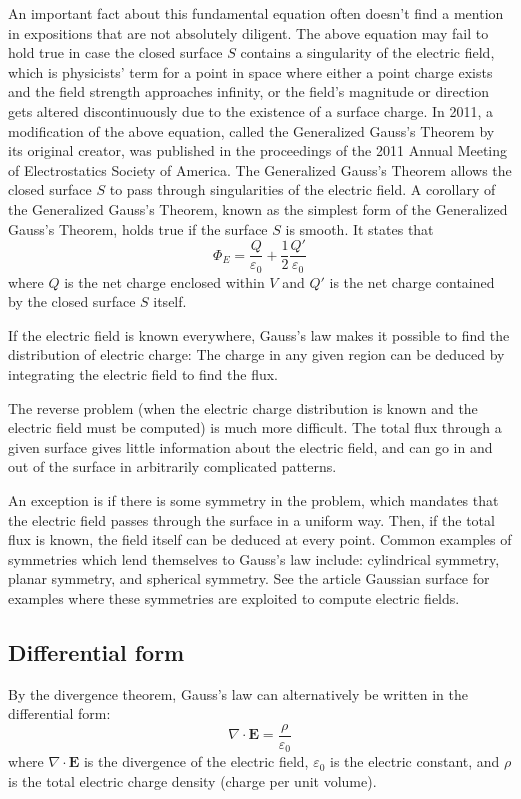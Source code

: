 \documentclass[a4paper, 12pt]{article}
\begin{document}
An important fact about this fundamental equation often doesn't find a mention in expositions that are not absolutely diligent. The above equation may fail to hold true in case the closed surface \(S\) contains a singularity of the electric field, which is physicists' term for a point in space where either a point charge exists and the field strength approaches infinity, or the field's magnitude or direction gets altered discontinuously due to the existence of a surface charge. In 2011, a modification of the above equation, called the Generalized Gauss's Theorem by its original creator, was published in the proceedings of the 2011 Annual Meeting of Electrostatics Society of America. The Generalized Gauss's Theorem allows the closed surface \(S\) to pass through singularities of the electric field. A corollary of the Generalized Gauss's Theorem, known as the simplest form of the Generalized Gauss's Theorem, holds true if the surface \(S\) is smooth. It states that 
\[
    \Phi_E = \frac{Q}{\varepsilon_0} + \frac{1}{2} \frac{Q'}{\varepsilon_0}
\]
where \(Q\) is the net charge enclosed within \(V\) and \(Q'\) is the net charge contained by the closed surface \(S\) itself. 

If the electric field is known everywhere, Gauss's law makes it possible to find the distribution of electric charge: The charge in any given region can be deduced by integrating the electric field to find the flux.

The reverse problem (when the electric charge distribution is known and the electric field must be computed) is much more difficult. The total flux through a given surface gives little information about the electric field, and can go in and out of the surface in arbitrarily complicated patterns.

An exception is if there is some symmetry in the problem, which mandates that the electric field passes through the surface in a uniform way. Then, if the total flux is known, the field itself can be deduced at every point. Common examples of symmetries which lend themselves to Gauss's law include: cylindrical symmetry, planar symmetry, and spherical symmetry. See the article Gaussian surface for examples where these symmetries are exploited to compute electric fields. 

\subsection{Differential form}
By the divergence theorem, Gauss's law can alternatively be written in the differential form: 
\[
    \nabla \cdot \mathbf{E} = \frac{\rho}{\varepsilon_0}
\]
where \(\nabla \cdot \mathbf{E}\) is the divergence of the electric field, \(\varepsilon_0\) is the electric constant, and \(\rho\) is the total electric charge density (charge per unit volume).
\end{document}
